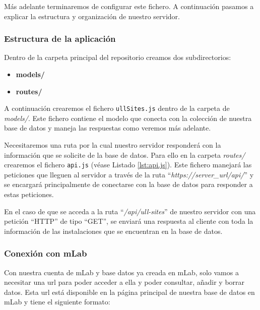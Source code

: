 Más adelante terminaremos de configurar este fichero. A continuación pasamos a explicar la estructura y organización de nuestro servidor.

\subsubsection{Estructura de la aplicación}

Dentro de la carpeta principal del repositorio creamos dos subdirectorios:

\begin{itemize}
    \item \textbf{models/}
    \item \textbf{routes/}
\end{itemize}

A continuación crearemos el fichero \texttt{ullSites.js} dentro de la carpeta de \textit{models/}. Este fichero contiene el modelo que conecta con la colección de nuestra base de datos y maneja las respuestas como veremos más adelante.   


Necesitaremos una ruta por la cual nuestro servidor responderá con la información que se solicite de la base de datos. Para ello en la carpeta \textit{routes/} crearemos el fichero \texttt{api.js} (véase Listado \ref{lst:api.js}). Este fichero manejará las peticiones que lleguen al servidor a través de la ruta ``\textit{https://server\_url/api/}'' y se encargará principalmente de conectarse con la base de datos para responder a estas peticiones.

 
En el caso de que se acceda a la ruta ``\textit{/api/ull-sites}'' de nuestro servidor con una petición ``HTTP'' de tipo ``GET'', se enviará una respuesta al cliente con toda la información de las instalaciones que se encuentran en la base de datos.

\subsubsection{Conexión con mLab}

Con nuestra cuenta de mLab y base datos ya creada en mLab, solo vamos a necesitar una url para poder acceder a ella y poder consultar, añadir y borrar datos. Esta url está disponible en la página principal de nuestra base de datos en mLab y tiene el siguiente formato:

